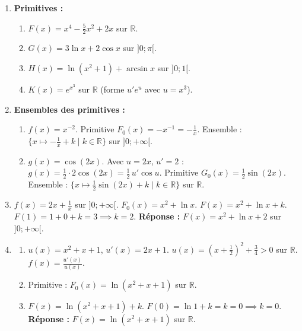 \documentclass[11pt]{article}
\begin{document}
\begin{corrige}
\begin{enumerate}
  \item \textbf{Primitives :}
  \begin{enumerate}
    \item $F(x) = x^4 - \frac{5}{2}x^2 + 2x$ sur $\mathbb{R}$.
    \item $G(x) = 3\ln x + 2\cos x$ sur $]0;\pi[$.
    \item $H(x) = \ln(x^2+1) + \arcsin x$ sur $]0;1[$.
    \item $K(x) = e^{x^3}$ sur $\mathbb{R}$ (forme $u'e^u$ avec $u=x^3$).
  \end{enumerate}
  
  \item \textbf{Ensembles des primitives :}
  \begin{enumerate}
    \item $f(x) = x^{-2}$. Primitive $F_0(x) = -x^{-1} = -\frac{1}{x}$.
    Ensemble : $\{ x \mapsto -\frac{1}{x} + k \mid k \in \mathbb{R} \}$ sur $]0;+\infty[$.
    \item $g(x) = \cos(2x)$. Avec $u=2x$, $u'=2$ : $g(x) = \frac{1}{2} \cdot 2\cos(2x) = \frac{1}{2}\,u'\cos u$.
    Primitive $G_0(x) = \frac{1}{2}\sin(2x)$.
    Ensemble : $\{ x \mapsto \frac{1}{2}\sin(2x) + k \mid k \in \mathbb{R} \}$ sur $\mathbb{R}$.
  \end{enumerate}
  
  \item $f(x) = 2x + \frac{1}{x}$ sur $]0;+\infty[$.
  $F_0(x) = x^2 + \ln x$.
  $F(x) = x^2 + \ln x + k$.
  $F(1) = 1 + 0 + k = 3 \implies k = 2$.
  \textbf{Réponse :} $F(x) = x^2 + \ln x + 2$ sur $]0;+\infty[$.
  
  \item \begin{enumerate}
    \item $u(x) = x^2+x+1$, $u'(x) = 2x+1$. $u(x) = (x+\frac{1}{2})^2 + \frac{3}{4} > 0$ sur $\mathbb{R}$.
    $f(x) = \frac{u'(x)}{u(x)}$.
    \item Primitive : $F_0(x) = \ln(x^2+x+1)$ sur $\mathbb{R}$.
    \item $F(x) = \ln(x^2+x+1) + k$.
    $F(0) = \ln 1 + k = k = 0 \implies k=0$.
    \textbf{Réponse :} $F(x) = \ln(x^2+x+1)$ sur $\mathbb{R}$.
  \end{enumerate}
\end{enumerate}
\end{corrige}
\end{document}
